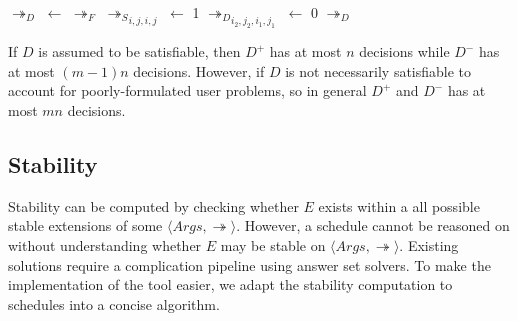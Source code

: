 \begin{algorithm}[H]
	\caption{}
	\begin{algorithmic}[1]
			\State $\twoheadrightarrow_D$ $\gets$ $\twoheadrightarrow_F$
				\State ${\twoheadrightarrow_S}_{i,j,i,j}$ $\gets$ 1
			\EndFor
						\State ${\twoheadrightarrow_D}_{i_2,j_2,i_1,j_1}$ $\gets$ 0				
					\EndFor
				\EndFor
			\EndFor
			\State \Return $\twoheadrightarrow_D$
		\EndFunction
	\end{algorithmic}
\end{algorithm}

If $D$ is assumed to be satisfiable, then $D^+$ has at most $n$ decisions while $D^-$ has at most $(m-1)n$ decisions. However, if $D$ is not necessarily satisfiable to account for poorly-formulated user problems, so in general $D^+$ and $D^-$ has at most $mn$ decisions.

\subsection{Stability}

Stability can be computed by checking whether $E$ exists within a all possible stable extensions of some $\langle Args, \twoheadrightarrow\rangle$. However, a schedule cannot be reasoned on without understanding whether $E$ may be stable on $\langle Args, \twoheadrightarrow\rangle$. Existing solutions require a complication pipeline using answer set solvers. To make the implementation of the tool easier, we adapt the stability computation to schedules into a concise algorithm.

